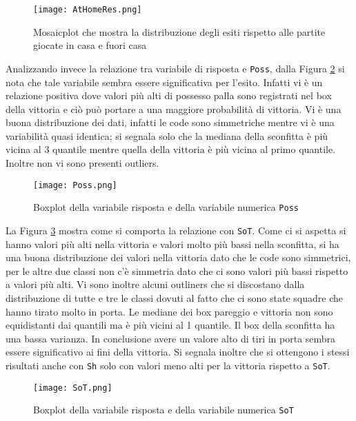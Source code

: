 \begin{figure}[htbp]
	\begin{center}
		\texttt{[image: AtHomeRes.png]}
		\caption{Mosaicplot che mostra la distribuzione degli esiti rispetto alle partite giocate in casa e fuori casa} \label{fig:AtHome}
	\end{center}
\end{figure}

Analizzando invece la relazione tra variabile di risposta e \texttt{Poss}, dalla Figura \ref{fig:Poss} si nota che tale variabile sembra essere significativa per l'esito. Infatti vi è un relazione positiva dove valori più alti di possesso palla sono registrati nel box della vittoria e ciò può portare a una maggiore probabilità di vittoria. Vi è una buona distribuzione dei dati, infatti le code sono simmetriche mentre vi è una variabilità quasi identica; si segnala solo che la mediana della sconfitta è più vicina al 3 quantile mentre quella della vittoria è più vicina al primo quantile. Inoltre non vi sono presenti outliers.

\begin{figure}[htbp]
	\begin{center}
		\texttt{[image: Poss.png]}
		\caption{Boxplot della variabile risposta e della variabile numerica \texttt{Poss} } \label{fig:Poss}
	\end{center}
\end{figure}

La Figura \ref{fig:sot} mostra come si comporta la relazione con \texttt{SoT}. Come ci si aspetta si hanno valori più alti nella vittoria e valori molto più bassi nella sconfitta, si ha una buona distribuzione dei valori nella vittoria dato che le code sono simmetrici, per le altre due classi non c'è simmetria dato che ci sono valori più bassi rispetto a valori più alti. Vi sono inoltre alcuni outliners che si discostano dalla distribuzione di tutte e tre le classi dovuti al fatto che ci sono state squadre che hanno tirato molto in porta. Le mediane dei box pareggio e vittoria non sono equidistanti dai quantili ma è più vicini al 1 quantile. Il box della sconfitta ha una bassa varianza. In conclusione avere un valore alto di tiri in porta sembra essere significativo ai fini della vittoria. Si segnala inoltre che si ottengono i stessi risultati anche con \texttt{Sh} solo con valori meno alti per la vittoria rispetto a \texttt{SoT}.\\

\begin{figure}[htbp]
	\begin{center}
		\texttt{[image: SoT.png]}
		\caption{Boxplot della variabile risposta e della variabile numerica \texttt{SoT} } \label{fig:sot}
	\end{center}
\end{figure}

